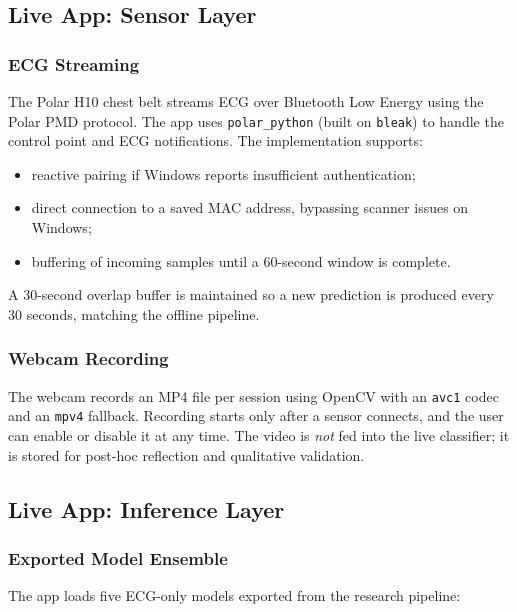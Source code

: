 \subsection{Live App: Sensor Layer}

\subsubsection{ECG Streaming}

The Polar H10 chest belt streams ECG over Bluetooth Low Energy using the Polar PMD protocol. The app uses \texttt{polar\_python} (built on \texttt{bleak}) to handle the control point and ECG notifications. The implementation supports:

\begin{itemize}
    \item reactive pairing if Windows reports insufficient authentication;
    \item direct connection to a saved MAC address, bypassing scanner issues on Windows;
    \item buffering of incoming samples until a 60-second window is complete.
\end{itemize}

A 30-second overlap buffer is maintained so a new prediction is produced every 30 seconds, matching the offline pipeline.

\subsubsection{Webcam Recording}

The webcam records an MP4 file per session using OpenCV with an \texttt{avc1} codec and an \texttt{mpv4} fallback. Recording starts only after a sensor connects, and the user can enable or disable it at any time. The video is
\textit{not} fed into the live classifier; it is stored for post-hoc reflection and qualitative validation.

\subsection{Live App: Inference Layer}

\subsubsection{Exported Model Ensemble}

The app loads five ECG-only models exported from the research pipeline:

